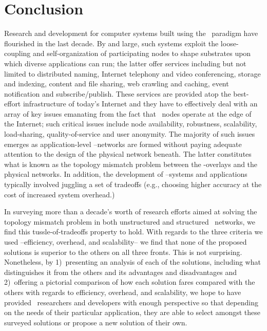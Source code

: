 \section{Conclusion}
\label{section:conclusion}

Research and development for computer systems
built using the \p\ paradigm have flourished  in the last decade.
By and large, such systems exploit the loose-coupling and self-organization 
of participating nodes to shape substrates upon which diverse applications 
can run; the latter offer services including but not limited to 
distributed naming, 
Internet telephony and video conferencing, 
storage and indexing, 
content and file sharing, 
web crawling and caching, 
event notification and subscribe/publish.
These services are provided atop the 
best-effort infrastructure of today's Internet 
and they have to effectively deal with an array of key issues
emanating from the fact that \p\ nodes 
operate at the edge of the Internet; such critical issues include
node availability, robustness, scalability, load-sharing,
quality-of-service and user anonymity.
The majority of such issues emerges as 
application-level \p--networks are formed without paying 
adequate attention to the design of the physical network beneath.
The latter constitutes what is known as the
topology mismatch problem between the \p-overlays and the physical networks.
In addition, the development of \p--systems and applications
typically involved juggling a set of tradeoffs (e.g.,
choosing higher accuracy at the cost of increased system overhead.)

In surveying more than
a decade's worth of research efforts aimed at solving the topology mismatch
problem in both unstructured and structured \p\ networks, we find this
tussle-of-tradeoffs property to hold.  
With regards to the three criteria we used --efficiency,
overhead, and scalability-- we find that none of the proposed solutions 
is superior to the others on all three fronts.  This is not surprising.
Nonetheless, by
1)~presenting an analysis of each of the solutions, 
including what distinguishes it from the
others and its advantages and disadvantages and 
2)~offering a pictorial
comparison of how each solution fares compared with the others with regards
to efficiency, overhead, and scalability, we hope to have provided \p\
researchers and developers with enough perspective so that depending 
on the needs of their particular application, they are able to select
amongst these surveyed solutions or propose a new solution of their own.
